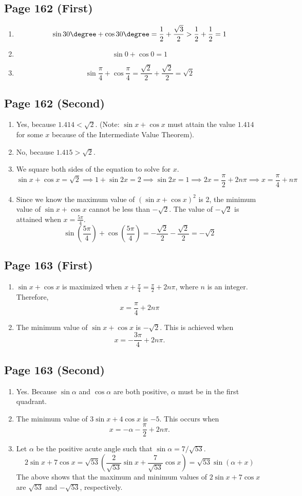 \documentclass{article}
\newenvironment{solutions}[1]
{\subsection*{#1}
 \begin{enumerate}[leftmargin=1.5em]}
{\end{enumerate}}
\newcommand{\solution}{\item}
\begin{document}
\begin{solutions}{Page 162 (First)}
\solution %
\[
\sin{30\degree}+\cos{30\degree} = \dfrac{1}{2} + \dfrac{\sqrt{3}}{2} > \dfrac{1}{2} + \dfrac{1}{2} = 1
\]

\solution %
\[
\sin{0}+\cos{0} = 1
\]

\solution %
\[
\sin{\dfrac{\pi}{4}} + \cos{\frac{\pi}{4}} = \dfrac{\sqrt{2}}{2} + \dfrac{\sqrt{2}}{2} = \sqrt{2}
\]
\end{solutions}

\begin{solutions}{Page 162 (Second)}
\solution %
Yes, because $1.414 < \sqrt{2}$. (Note: $\sin{x}+\cos{x}$ must attain the value $1.414$ for some $x$ because of the Intermediate Value Theorem).

\solution %
No, because $1.415 > \sqrt{2}$.

\solution %
We square both sides of the equation to solve for $x$.
\[
\sin{x}+\cos{x}=\sqrt{2} \implies 1 + \sin{2x} = 2 \implies \sin{2x} = 1 \implies 2x = \dfrac{\pi}{2} + 2n\pi \implies x = \dfrac{\pi}{4} + n\pi
\]

\solution %
Since we know the maximum value of $\left(\sin{x}+\cos{x}\right)^2$ is 2, the minimum value of $\sin{x}+\cos{x}$ cannot be less than $-\sqrt{2}$. The value of $-\sqrt{2}$ is attained when $x=\tfrac{5\pi}{4}$.
\[
\sin\left(\dfrac{5\pi}{4}\right) + \cos\left(\dfrac{5\pi}{4}\right) = -\dfrac{\sqrt{2}}{2} - \dfrac{\sqrt{2}}{2} = -\sqrt{2}
\]
\end{solutions}

\begin{solutions}{Page 163 (First)}
\solution %
$\sin{x}+\cos{x}$ is maximized when $x + \tfrac{\pi}{4} = \tfrac{\pi}{2} + 2n\pi$, where $n$ is an integer. Therefore,
\[
x = \dfrac{\pi}{4} + 2n\pi
\]
\solution %
The minimum value of $\sin{x}+\cos{x}$ is $-\sqrt{2}$. This is achieved when
\[
x = -\dfrac{3\pi}{4} + 2n\pi.
\]
\end{solutions}

\begin{solutions}{Page 163 (Second)}
\solution %
Yes. Because $\sin{\alpha}$ and $\cos{\alpha}$ are both positive, $\alpha$ must be in the first quadrant.

\solution %
The minimum value of $3\sin{x}+4\cos{x}$ is $-5$. This occurs when
\[
x = -\alpha - \dfrac{\pi}{2} + 2n\pi.
\]

\solution %
Let $\alpha$ be the positive acute angle such that $\sin{\alpha} = 7/\sqrt{53}$.
\[
2\sin{x}+7\cos{x} = \sqrt{53} \left(\dfrac{2}{\sqrt{53}}\sin{x} + \dfrac{7}{\sqrt{53}}\cos{x}\right) = \sqrt{53}\sin\left(\alpha+x\right)
\]
The above shows that the maximum and minimum values of $2\sin{x}+7\cos{x}$ are $\sqrt{53}$ and $-\sqrt{53}$, respectively.

\end{solutions}
\end{document}
